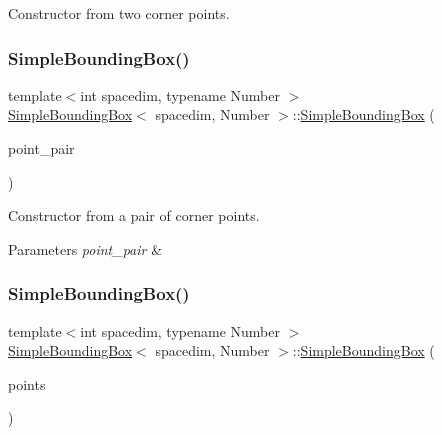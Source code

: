 Constructor from two corner points. \mbox{\label{classSimpleBoundingBox_a75acd8fd3479b814c7e146d6948c1366}} 
\subsubsection{\texorpdfstring{Simple\+Bounding\+Box()}{SimpleBoundingBox()}\hspace{0.1cm}{\footnotesize\ttfamily [3/7]}}
{\footnotesize\ttfamily template$<$int spacedim, typename Number $>$ \\
\hyperlink{classSimpleBoundingBox}{Simple\+Bounding\+Box}$<$ spacedim, Number $>$\+::\hyperlink{classSimpleBoundingBox}{Simple\+Bounding\+Box} (\begin{DoxyParamCaption}\item[{const std\+::pair$<$ Point$<$ spacedim, Number $>$, Point$<$ spacedim, Number $>$$>$ \&}]{point\+\_\+pair }\end{DoxyParamCaption})}

Constructor from a pair of corner points. 
\begin{DoxyParams}{Parameters}
{\em point\+\_\+pair} & \\
\hline
\end{DoxyParams}
\mbox{\label{classSimpleBoundingBox_a4762c89a859a0040438b2f6b44defc79}} 
\subsubsection{\texorpdfstring{Simple\+Bounding\+Box()}{SimpleBoundingBox()}\hspace{0.1cm}{\footnotesize\ttfamily [4/7]}}
{\footnotesize\ttfamily template$<$int spacedim, typename Number $>$ \\
\hyperlink{classSimpleBoundingBox}{Simple\+Bounding\+Box}$<$ spacedim, Number $>$\+::\hyperlink{classSimpleBoundingBox}{Simple\+Bounding\+Box} (\begin{DoxyParamCaption}\item[{const std\+::vector$<$ Point$<$ spacedim, Number $>$$>$ \&}]{points }\end{DoxyParamCaption})}

